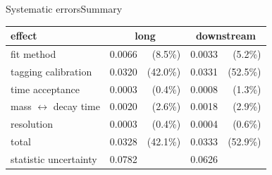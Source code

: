 \documentclass{beamer}
\begin{document}
\begin{frame}{Systematic errors}{Summary}
\begin{center}
\begin{tabular}{l |c r | c r}
\hline \hline
effect & \multicolumn{2}{c|}{long} & \multicolumn{2}{c}{downstream} \\ \hline
fit  method & 0.0066 & (8.5\%) & 0.0033 & (5.2\%)\\
tagging calibration & 0.0320 & (42.0\%) & 0.0331 & (52.5\%)\\
time acceptance & 0.0003 & (0.4\%) & 0.0008 & (1.3\%)\\
mass $\leftrightarrow$ decay time & 0.0020 & (2.6\%) & 0.0018 & (2.9\%)\\
resolution & 0.0003 & (0.4\%) & 0.0004 & (0.6\%)\\ \hline
total & 0.0328 & (42.1\%) & 0.0333 & (52.9\%)\\ \hline
statistic uncertainty & 0.0782 & & 0.0626 & \\ \hline \hline
\end{tabular}
\end{center}
\end{frame}
\end{document}

